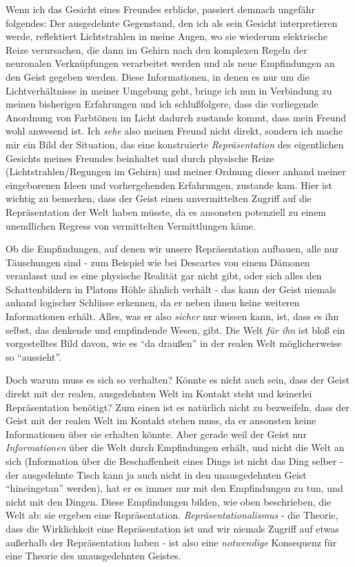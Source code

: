 \documentclass[a4paper, 12pt]{article}
\begin{document}
\begin{onehalfspace}
Wenn ich das Gesicht eines Freundes erblicke, passiert demnach ungefähr folgendes: Der ausgedehnte Gegenstand, den ich als sein Gesicht interpretieren werde, reflektiert Lichtstrahlen in meine Augen, wo sie wiederum elektrische Reize verursachen, die dann im Gehirn nach den komplexen Regeln der neuronalen Verknüpfungen verarbeitet werden und als neue Empfindungen an den Geist gegeben werden. Diese Informationen, in denen es nur um die Lichtverhältnisse in meiner Umgebung geht, bringe ich nun in Verbindung zu meinen bisherigen Erfahrungen und ich schlußfolgere, dass die vorliegende Anordnung von Farbtönen im Licht dadurch zustande kommt, dass mein Freund wohl anwesend ist. Ich \emph{sehe} also meinen Freund nicht direkt, sondern ich mache mir ein Bild der Situation, das eine konstruierte \emph{Repräsentation} des eigentlichen Gesichts meines Freundes beinhaltet und durch physische Reize (Lichtstrahlen/Regungen im Gehirn) und meiner Ordnung dieser anhand meiner eingeborenen Ideen und vorhergehenden Erfahrungen, zustande kam. Hier ist wichtig zu bemerken, dass der Geist einen unvermittelten Zugriff auf die Repräsentation der Welt haben müsste, da es ansonsten potenziell zu einem unendlichen Regress von vermittelten Vermittlungen käme.

Ob die Empfindungen, auf denen wir unsere Repräsentation aufbauen, alle nur Täu\-schungen sind - zum Beispiel wie bei Descartes von einem Dämonen veranlasst und es eine physische Realität gar nicht gibt, oder sich alles den Schattenbildern in Platons Höhle ähnlich verhält - das kann der Geist niemals anhand logischer Schlüsse erkennen, da er neben ihnen keine weiteren Informationen erhält. Alles, was er also \emph{sicher} nur wissen kann, ist, dass es ihn selbst, das denkende und empfindende Wesen, gibt. Die Welt \emph{für ihn} ist bloß ein vorgestelltes Bild davon, wie es "`da draußen"' in der realen Welt möglicherweise so "`aussieht"'.

Doch warum muss es sich so verhalten? Könnte es nicht auch sein, dass der Geist direkt mit der realen, ausgedehnten Welt im Kontakt steht und keinerlei Repräsentation benötigt? Zum einen ist es natürlich nicht zu bezweifeln, dass der Geist mit der realen Welt im Kontakt stehen muss, da er ansonsten keine Informationen über sie erhalten könnte. Aber gerade weil der Geist nur \emph{Informationen} über die Welt durch Empfindungen erhält, und nicht die Welt an sich (Information über die Beschaffenheit eines Dings ist nicht das Ding selber - der ausgedehnte Tisch kann ja auch nicht in den unausgedehnten Geist "`hineingetan"' werden), hat er es immer nur mit den Empfindungen zu tun, und nicht mit den Dingen. Diese Empfindungen bilden, wie oben beschrieben, die Welt ab: sie ergeben eine Repräsentation. \emph{Repräsentationalismus} - die Theorie, dass die Wirklichkeit eine Repräsentation ist und wir niemals Zugriff auf etwas außerhalb der Repräsentation haben - ist also eine \emph{notwendige} Konsequenz für eine Theorie des unausgedehnten Geistes.


\end{onehalfspace}
\end{document}
